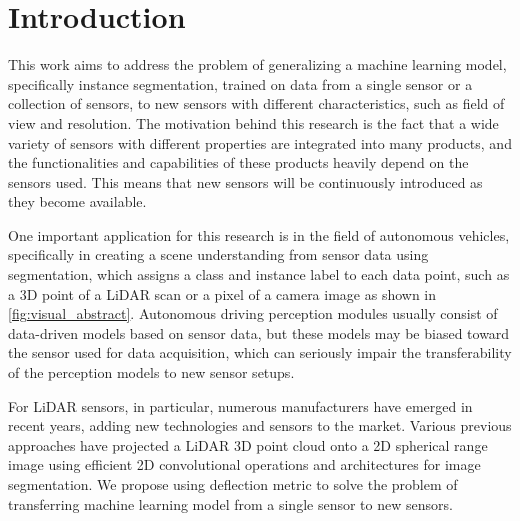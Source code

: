 \section{\large Introduction}
\label{sec_introduction}


This work aims to address the problem of generalizing a machine learning model, specifically instance segmentation, trained on data from a single sensor or a collection of sensors, to new sensors with different characteristics, such as field of view and resolution. The motivation behind this research is the fact that a wide variety of sensors with different properties are integrated into many products, and the functionalities and capabilities of these products heavily depend on the sensors used. This means that new sensors will be continuously introduced as they become available.

One important application for this research is in the field of autonomous vehicles, specifically in creating a scene understanding from sensor data using segmentation, which assigns a class and instance label to each data point, such as a 3D point of a LiDAR scan or a pixel of a camera image as shown in \autoref{fig:visual_abstract}. Autonomous driving perception modules usually consist of data-driven models based on sensor data, but these models may be biased toward the sensor used for data acquisition, which can seriously impair the transferability of the perception models to new sensor setups.

For LiDAR sensors, in particular, numerous manufacturers have emerged in recent years, adding new technologies and sensors to the market. Various previous approaches have projected a LiDAR 3D point cloud onto a 2D spherical range image using efficient 2D convolutional operations and architectures for image segmentation. We propose using deflection metric to solve the problem of transferring machine learning model from a single sensor to new sensors.


